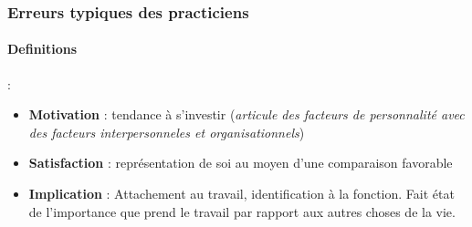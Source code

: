 \documentclass[11pt]{article} %
\begin{document}
\subsubsection{Erreurs typiques des practiciens}

\paragraph{Definitions} :
\begin{itemize}
    \item \textbf{Motivation} : tendance à s'investir (\textit{articule
            des facteurs de personnalité avec des facteurs
        interpersonneles et organisationnels})
    \item \textbf{Satisfaction} : représentation de soi au moyen d'une
        comparaison favorable
    \item \textbf{Implication} : Attachement au travail, identification à la
        fonction. Fait état de l'importance que prend le travail par rapport
        aux autres choses de la vie. 
\end{itemize}
\end{document}
